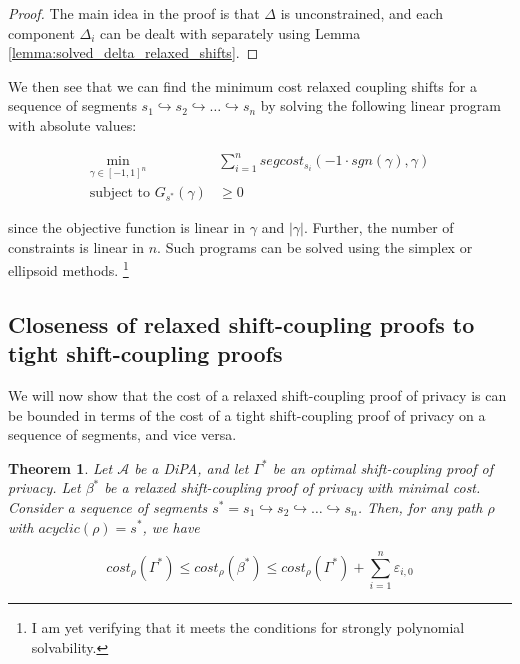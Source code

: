 \documentclass{article}
\newtheorem{theorem}{Theorem}
\renewcommand{\epsilon}{\varepsilon}
\newcommand{\1}{\langle 1 \rangle}
\newcommand{\2}{\langle 2 \rangle}
\begin{document}
\begin{proof}
    The main idea in the proof is that $\Delta$ is unconstrained, and each component $\Delta_i$ can be dealt with separately using Lemma \ref{lemma:solved_delta_relaxed_shifts}. 
\end{proof}

We then see that we can find the minimum cost relaxed coupling shifts for a sequence of segments $s_1 \hookrightarrow s_2 \hookrightarrow \dots \hookrightarrow s_n$ by solving the following linear program with absolute values: 

\begin{align*}
    \min_{\gamma \in [-1, 1]^n} &\sum_{i = 1}^n segcost_{s_i}(-1 \cdot sgn(\gamma), \gamma) \\
    \text{subject to } G_{s^*}(\gamma) &\geq 0
\end{align*}

since the objective function is linear in $\gamma$ and $|\gamma|$. Further, the number of constraints is linear in $n$. Such programs can be solved using the simplex or ellipsoid methods. \footnote{I am yet verifying that it meets the conditions for strongly polynomial solvability.}


\subsection{Closeness of relaxed shift-coupling proofs to tight shift-coupling proofs}

We will now show that the cost of a relaxed shift-coupling proof of privacy is can be bounded in terms of the cost of a tight shift-coupling proof of privacy on a sequence of segments, and vice versa. 

\begin{theorem}
    \label{thm:relaxed_shifts_close}
    Let $\mathcal{A}$ be a DiPA, and let $\Gamma^*$ be an optimal shift-coupling proof of privacy. Let $\beta^*$ be a relaxed shift-coupling proof of privacy with minimal cost. Consider a sequence of segments $s^* = s_1 \hookrightarrow s_2 \hookrightarrow \dots \hookrightarrow s_n$. Then, for any path $\rho$ with $acyclic(\rho) = s^*$, we have

    \[cost_\rho(\Gamma^*) \leq cost_\rho(\beta^*) \leq cost_\rho(\Gamma^*) + \sum_{i = 1}^n \epsilon_{i, 0} \]
\end{theorem}
\end{document}
